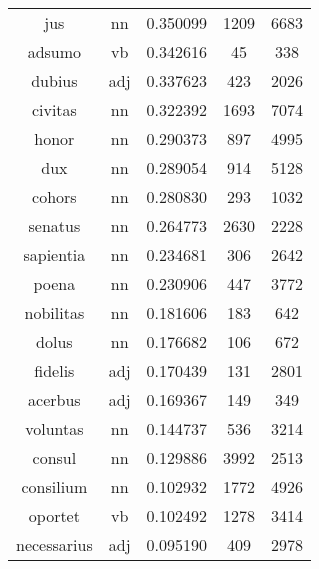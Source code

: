 \begin{table}
\begin{tabular}{ccccc}
jus              & nn            & 0.350099           & 1209               & 6683                \\
adsumo           & vb            & 0.342616           & 45                 & 338                 \\
dubius           & adj           & 0.337623           & 423                & 2026                \\
civitas          & nn            & 0.322392           & 1693               & 7074                \\
honor            & nn            & 0.290373           & 897                & 4995                \\
dux              & nn            & 0.289054           & 914                & 5128                \\
cohors           & nn            & 0.280830           & 293                & 1032                \\
senatus          & nn            & 0.264773           & 2630               & 2228                \\
sapientia        & nn            & 0.234681           & 306                & 2642                \\
poena            & nn            & 0.230906           & 447                & 3772                \\
nobilitas        & nn            & 0.181606           & 183                & 642                 \\
dolus            & nn            & 0.176682           & 106                & 672                 \\
fidelis          & adj           & 0.170439           & 131                & 2801                \\
acerbus          & adj           & 0.169367           & 149                & 349                 \\
voluntas         & nn            & 0.144737           & 536                & 3214                \\
consul           & nn            & 0.129886           & 3992               & 2513                \\
consilium        & nn            & 0.102932           & 1772               & 4926                \\
oportet          & vb            & 0.102492           & 1278               & 3414                \\
necessarius      & adj           & 0.095190           & 409                & 2978                \\

\end{tabular}
\end{table}
